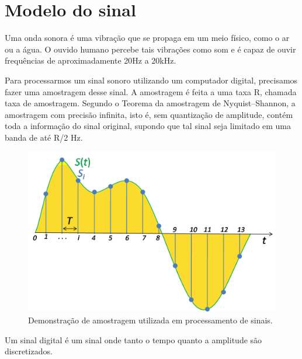 \section{Modelo do sinal}
\label{sec:modelo}

Uma onda sonora é uma vibração que se propaga em um meio físico, como o ar ou a água. O ouvido humano percebe tais vibrações como som e é capaz de ouvir frequências de aproximadamente 20Hz a 20kHz.

Para processarmos um sinal sonoro utilizando um computador digital, precisamos fazer uma amostragem desse sinal. A amostragem é feita a uma taxa R, chamada taxa de amostragem. Segundo o Teorema da amostragem de Nyquist–Shannon, a amostragem com precisão infinita, isto é, sem quantização de amplitude, contém toda a informação do sinal original, supondo que tal sinal seja limitado em uma banda de até R/2 Hz.

\begin{figure}[h]
\centering
\includegraphics[width=0.6\linewidth]{figuras/Signal_Sampling.png}
\caption{\label{fig:Signal_Sampling}Demonstração de amostragem utilizada em processamento de sinais.}
\end{figure}

Um sinal digital é um sinal onde tanto o tempo quanto a amplitude são discretizados.

